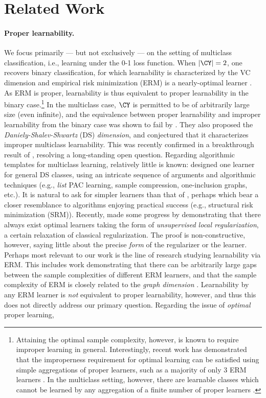 \section{Related Work}
\paragraph{Proper learnability.} We focus primarily --- but not exclusively --- on the setting of multiclass classification, i.e., learning under the 0-1 loss function. When $|\CY| = 2$, one recovers binary classification, for which learnability is characterized by the VC dimension and empirical risk minimization (ERM) is a nearly-optimal learner \citep{BEHW89,shalev2014understanding}.
As ERM is proper, learnability is thus equivalent to proper learnability in the binary case.\footnote{Attaining the optimal sample complexity, however, is known to require improper learning in general. Interestingly, recent work has demonstrated that the improperness requirement for optimal learning can be satisfied using simple aggregations of proper learners, such as a majority of only 3 ERM learners \citep{hanneke2016optimal,larsen2023bagging,aden2024majority}. In the multiclass setting, however, there are learnable classes which cannot be learned by any aggregation of a finite number of proper learners \citep{asilisunderstanding}.} In the multiclass case, $\CY$ is permitted to be of arbitrarily large size (even infinite), and the equivalence between proper learnability and improper learnability from the binary case was shown to fail by \citet{DS14}. They also proposed the \emph{Daniely-Shalev-Shwartz} (DS) \emph{dimension}, and conjectured that it characterizes improper multiclass learnability. This was recently confirmed in a breakthrough result of \citet{brukhim2022characterization}, resolving a long-standing open question. Regarding algorithmic templates for multiclass learning, relatively little is known: \citet{brukhim2022characterization} designed one learner for general DS classes, using an intricate sequence of arguments and algorithmic techniques (e.g., \emph{list} PAC learning, sample compression, one-inclusion graphs, etc.). It is natural to ask for simpler learners than that of \citet{brukhim2022characterization}, perhaps which bear a closer resemblance to algorithms enjoying practical success (e.g., structural risk minimization (SRM)). Recently, \citet{asilis2024regularization} made some progress by demonstrating that there always exist optimal learners taking the form of \emph{unsupervised local regularization}, a certain relaxation of classical regularization. The proof is non-constructive, however, saying little about the precise \emph{form} of the regularizer or the learner. Perhaps most relevant to our work is the line of research studying learnability via ERM. This includes work demonstrating that there can be arbitrarily large gaps between the sample complexities of different ERM learners, and that the sample complexity of ERM is closely related to the \emph{graph dimension} \citep{daniely2015multiclass}. Learnability by any ERM learner is \emph{not} equivalent to proper learnability, however, and thus this does not directly address our primary question. Regarding the issue of \emph{optimal} proper learning, 